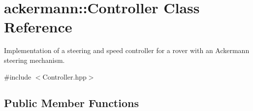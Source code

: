 \hypertarget{classackermann_1_1_controller}{}\section{ackermann\+:\+:Controller Class Reference}
\label{classackermann_1_1_controller}


Implementation of a steering and speed controller for a rover with an Ackermann steering mechanism.  




{\ttfamily \#include $<$Controller.\+hpp$>$}

\subsection*{Public Member Functions}

